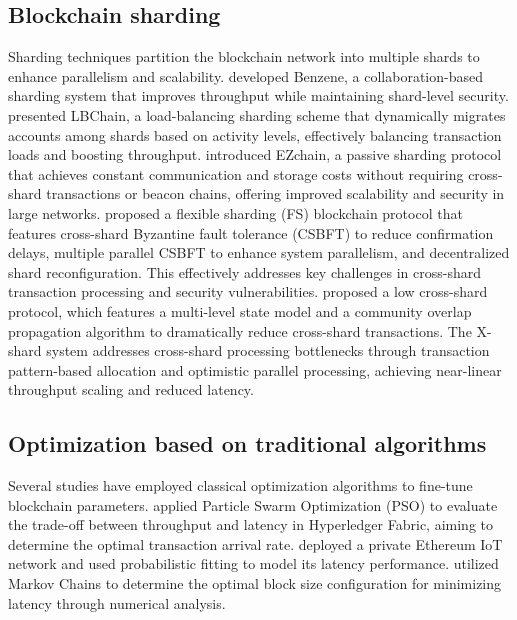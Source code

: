 \documentclass[a4paper,fleqn]{cas-dc}
\begin{document}
\subsection{Blockchain sharding}
\vspace{6pt}
Sharding techniques partition the blockchain network into multiple shards to enhance parallelism and scalability. \citet{cai2022benzene} developed Benzene, a collaboration-based sharding system that improves throughput while maintaining shard-level security. \citet{li2023lb} presented LBChain, a load-balancing sharding scheme that dynamically migrates accounts among shards based on activity levels, effectively balancing transaction loads and boosting throughput.
\citet{yang2024ezchain} introduced EZchain, a passive sharding protocol that achieves constant communication and storage costs without requiring cross-shard transactions or beacon chains, offering improved scalability and security in large networks.
\citet{liu2023flexible} proposed a flexible sharding (FS) blockchain protocol that features cross-shard Byzantine fault tolerance (CSBFT) to reduce confirmation delays, multiple parallel CSBFT to enhance system parallelism, and decentralized shard reconfiguration. This effectively addresses key challenges in cross-shard transaction processing and security vulnerabilities.
\citet{jia2024estuary} proposed a low cross-shard protocol, which features a multi-level state model and a community overlap propagation algorithm to dramatically reduce cross-shard transactions.
The X-shard system \citep{xu2024x} addresses cross-shard processing bottlenecks through transaction pattern-based allocation and optimistic parallel processing, achieving near-linear throughput scaling and reduced latency.

\subsection{Optimization based on traditional algorithms}
\vspace{6pt}
Several studies have employed classical optimization algorithms to fine-tune blockchain parameters. \citet{jamil2022improving} applied Particle Swarm Optimization (PSO) to evaluate the trade-off between throughput and latency in Hyperledger Fabric, aiming to determine the optimal transaction arrival rate. \citet{chen2022latency} deployed a private Ethereum IoT network and used probabilistic fitting to model its latency performance. \citet{wilhelmi2022end} utilized Markov Chains to determine the optimal block size configuration for minimizing latency through numerical analysis.
\end{document}
